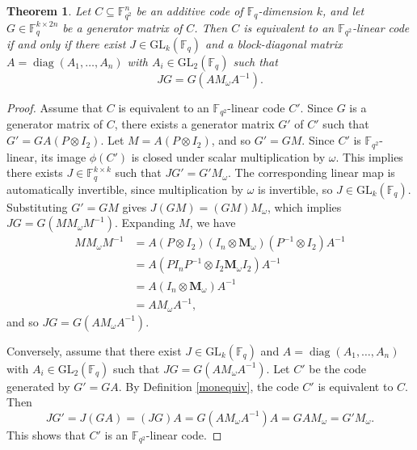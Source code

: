 \documentclass[a4paper,12pt]{article}
\theoremstyle{plain}
\newtheorem{theorem}[lemma]{Theorem}
\theoremstyle{definition}
\begin{document}
\begin{theorem} \label{additivecharacterization}
Let $C \subseteq \mathbb{F}_{q^2}^n$ be an additive code of $\mathbb{F}_q$-dimension $k$, and let $G \in \mathbb{F}_q^{k \times 2n}$ be a generator matrix of $C$. 
Then $C$ is equivalent to an $\mathbb{F}_{q^2}$-linear code if and only if there exist $J \in \textrm{GL}_k(\mathbb{F}_q)$ and a block-diagonal matrix $A = \operatorname{diag}(A_1, \dots, A_n)$ with 
$A_i \in \textrm{GL}_2(\mathbb{F}_q)$
such that
\[ J G = G (A M_\omega A^{-1}). \]
\end{theorem}
\begin{proof} 
 Assume that $C$ is equivalent to an $\mathbb{F}_{q^2}$-linear code $C'$.  Since $G$ is a generator matrix of $C$, there exists a generator matrix $G'$ of $C'$ such that $G' = G A(P \otimes I_2)$. Let $M = A(P \otimes I_2)$, and so $G' = GM$. 
Since  $C'$ is $\mathbb{F}_{q^2}$-linear, its image $\phi(C')$ is closed under scalar multiplication by $\omega$. 
 This implies there exists $J \in \mathbb{F}_q^{k \times k}$ such that $J G' = G' M_\omega$. The corresponding linear map is automatically invertible, since multiplication by $\omega$ is invertible, so $J \in \mathrm{GL}_k(\mathbb{F}_q)$.
Substituting $G' = GM$ gives $J (GM) = (GM) M_\omega$, which implies $J G = G(M M_\omega M^{-1})$. Expanding $M$, we have
\begin{align*}
M M_\omega M^{-1} &= A(P \otimes I_2) (I_n \otimes \mathbf{M}_\omega) (P^{-1} \otimes I_2) A^{-1} \\
  &= A(P I_n P^{-1} \otimes I_2 \mathbf{M}_\omega I_2) A^{-1} \\
  &= A(I_n \otimes \mathbf{M}_\omega) A^{-1} \\
  &= A M_\omega A^{-1},
\end{align*} 
and so $J G = G (A M_\omega A^{-1}).$

Conversely, assume that there exist $J \in \textrm{GL}_k(\mathbb{F}_q)$ and $A = \operatorname{diag}(A_1, \dots, A_n)$ 
with $A_i \in \textrm{GL}_2(\mathbb{F}_q)$
such that $J G = G (A M_\omega A^{-1})$.
Let $C'$ be the code generated by $G' = GA$. 
By Definition \ref{monequiv}, the code $C'$ is equivalent  to $C$. 
Then
\[ J G' = J(GA) = (JG)A = G(AM_\omega A^{-1})A = GAM_\omega = G'M_\omega. \]
This shows that $C'$ is an $\mathbb{F}_{q^2}$-linear code.
\end{proof}



 
\end{document}
